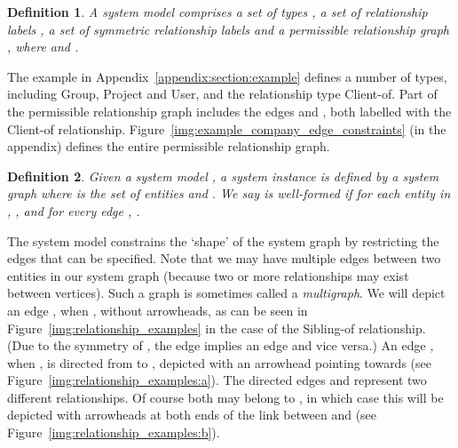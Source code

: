\documentclass{article}
\newtheorem{definition}{Definition}
\begin{document}
\begin{definition}
    A \emph{system model} comprises a set of types , a set of relationship labels , a set of \emph{symmetric} relationship labels  and a \emph{permissible relationship graph} , where  and .
\end{definition}

The example in Appendix~\ref{appendix:section:example} defines a number of types, including \textsf{Group}, \textsf{Project} and \textsf{User}, and the relationship type \textsf{Client-of}.
Part of the permissible relationship graph includes the edges  and , both labelled with the \textsf{Client-of} relationship.
Figure~\ref{img:example_company_edge_constraints} (in the appendix) defines the entire permissible relationship graph.

\begin{definition}
    Given a system model , a \emph{system instance} is defined by a \emph{system graph}  where  is the set of entities and .
    We say  is \emph{well-formed} if for each entity  in , , and for every edge , .
\end{definition}

The system model constrains the `shape' of the system graph by restricting the edges that can be specified.
Note that we may have multiple edges between two entities in our system graph (because two or more relationships may exist between vertices).
Such a graph is sometimes called a \emph{multigraph}.
We will depict an edge , when , without arrowheads, as can be seen in Figure~\ref{img:relationship_examples} in the case of the \textsf{Sibling-of} relationship.
(Due to the symmetry of , the edge  implies an edge  and vice versa.)
An edge , when , is directed from  to , depicted with an arrowhead pointing towards  (see Figure~\ref{img:relationship_examples:a}).
The directed edges  and  represent two different relationships. Of course both may belong to , in which case this will be depicted with arrowheads at both ends of the link between  and  (see Figure~\ref{img:relationship_examples:b}).
\end{document}
